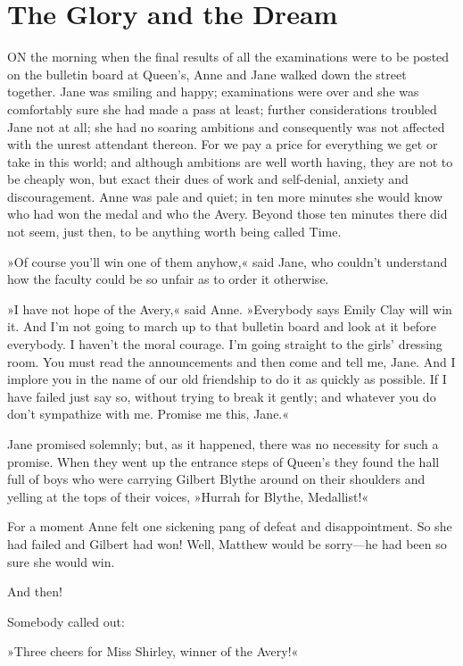 \chapter{The Glory and the Dream}

ON the morning when the final results of all the examinations were to be posted on the bulletin board at Queen’s, Anne and Jane walked down the street together. Jane was smiling and happy; examinations were over and she was comfortably sure she had made a pass at least; further considerations troubled Jane not at all; she had no soaring ambitions and consequently was not affected with the unrest attendant thereon. For we pay a price for everything we get or take in this world; and although ambitions are well worth having, they are not to be cheaply won, but exact their dues of work and self-denial, anxiety and discouragement. Anne was pale and quiet; in ten more minutes she would know who had won the medal and who the Avery. Beyond those ten minutes there did not seem, just then, to be anything worth being called Time.

»Of course you’ll win one of them anyhow,« said Jane, who couldn’t understand how the faculty could be so unfair as to order it otherwise.

»I have not hope of the Avery,« said Anne. »Everybody says Emily Clay will win it. And I’m not going to march up to that bulletin board and look at it before everybody. I haven’t the moral courage. I’m going straight to the girls’ dressing room. You must read the announcements and then come and tell me, Jane. And I implore you in the name of our old friendship to do it as quickly as possible. If I have failed just say so, without trying to break it gently; and whatever you do don’t sympathize with me. Promise me this, Jane.«

Jane promised solemnly; but, as it happened, there was no necessity for such a promise. When they went up the entrance steps of Queen’s they found the hall full of boys who were carrying Gilbert Blythe around on their shoulders and yelling at the tops of their voices, »Hurrah for Blythe, Medallist!«

For a moment Anne felt one sickening pang of defeat and disappointment. So she had failed and Gilbert had won! Well, Matthew would be sorry—he had been so sure she would win.

And then!

Somebody called out:

»Three cheers for Miss Shirley, winner of the Avery!«

